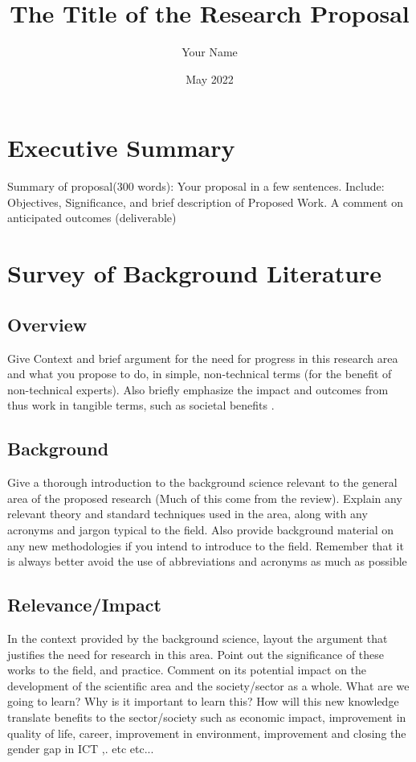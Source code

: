 \documentclass[12pt]{article}
\title{\textbf{The Title of the Research Proposal}}
\author{Your Name}
\date{May 2022}
\begin{document}
\maketitle

\section{Executive Summary}

Summary of proposal(300 words): Your proposal in a few sentences. Include: Objectives, Significance, and brief description of Proposed Work. A comment on anticipated outcomes (deliverable)

\section{Survey of Background Literature}

\subsection{Overview}

Give Context and brief argument for the need for progress in this research area and what you propose to do, in simple, non-technical terms (for the benefit of non-technical experts). Also briefly emphasize the impact and outcomes from thus work in tangible terms, such as societal benefits \citep{Wang2020}.
\subsection{Background}

Give a thorough introduction to the background science relevant to the general area of the proposed research (Much of this come from the review). Explain any relevant theory and standard techniques used in the area, along with any acronyms and jargon typical to the field. Also provide background material on any new methodologies if you intend to introduce to the field. Remember that it is always better avoid the use of abbreviations and acronyms as much as possible

\subsection{Relevance/Impact}

In the context provided by the background science, layout the argument that justifies the need for research in this area. Point out the significance of these works to the field, and practice. Comment on its potential impact on the development of the scientific area and the society/sector as a whole. What are we going to learn? Why is it important to learn this? How will this new knowledge translate benefits to the sector/society such as economic impact, improvement in quality of life, career, improvement in environment, improvement and closing the gender gap in ICT ,. etc etc...
\end{document}
